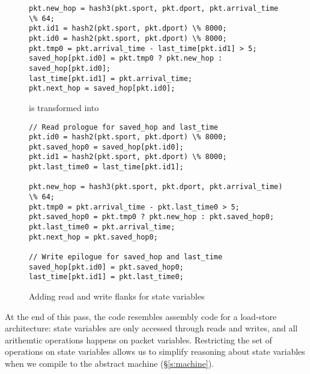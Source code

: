 \begin{figure}
\begin{tiny}
\begin{lstlisting}
pkt.new_hop = hash3(pkt.sport, pkt.dport, pkt.arrival_time \% 64;
pkt.id1 = hash2(pkt.sport, pkt.dport) \% 8000;
pkt.id0 = hash2(pkt.sport, pkt.dport) \% 8000;
pkt.tmp0 = pkt.arrival_time - last_time[pkt.id1] > 5;
saved_hop[pkt.id0] = pkt.tmp0 ? pkt.new_hop : saved_hop[pkt.id0];
last_time[pkt.id1] = pkt.arrival_time;
pkt.next_hop = saved_hop[pkt.id0];
\end{lstlisting}
\end{tiny}
\begin{center}
is transformed into
\end{center}
\begin{tiny}
\begin{lstlisting}
// Read prologue for saved_hop and last_time
pkt.id0 = hash2(pkt.sport, pkt.dport) \% 8000;
pkt.saved_hop0 = saved_hop[pkt.id0];
pkt.id1 = hash2(pkt.sport, pkt.dport) \% 8000;
pkt.last_time0 = last_time[pkt.id1];

pkt.new_hop = hash3(pkt.sport, pkt.dport, pkt.arrival_time) \% 64;
pkt.tmp0 = pkt.arrival_time - pkt.last_time0 > 5;
pkt.saved_hop0 = pkt.tmp0 ? pkt.new_hop : pkt.saved_hop0;
pkt.last_time0 = pkt.arrival_time;
pkt.next_hop = pkt.saved_hop0;

// Write epilogue for saved_hop and last_time
saved_hop[pkt.id0] = pkt.saved_hop0;
last_time[pkt.id1] = pkt.last_time0;
\end{lstlisting}
\end{tiny}
\caption{Adding read and write flanks for state variables}
\label{fig:stateful_flanks}
\end{figure}

At the end of this pass, the code resembles assembly code for a load-store
architecture: state variables are only accessed through reads and writes, and
all arithemtic operations happens on packet variables. Restricting the set of
operations on state variables allows us to simplify reasoning about state
variables when we compile \pktlanguage to the abstract machine
(\S\ref{s:machine}).


